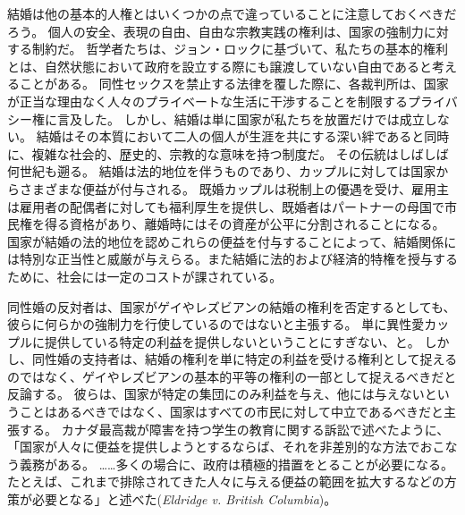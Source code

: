 \documentclass[paper=a4,book,openany]{jlreq}
\begin{document}
結婚は他の基本的人権とはいくつかの点で違っていることに注意しておくべきだろう。
個人の安全、表現の自由、自由な宗教実践の権利は、国家の強制力に対する制約だ。
哲学者たちは、ジョン・ロックに基づいて、私たちの基本的権利とは、自然状態において政府を設立する際にも譲渡していない自由であると考えることがある。
同性セックスを禁止する法律を覆した際に、各裁判所は、国家が正当な理由なく人々のプライベートな生活に干渉することを制限するプライバシー権に言及した。
しかし、結婚は単に国家が私たちを放置だけでは成立しない。
結婚はその本質において二人の個人が生涯を共にする深い絆であると同時に、複雑な社会的、歴史的、宗教的な意味を持つ制度だ。
その伝統はしばしば何世紀も遡る。
結婚は法的地位を伴うものであり、カップルに対しては国家からさまざまな便益が付与される。
既婚カップルは税制上の優遇を受け、雇用主は雇用者の配偶者に対しても福利厚生を提供し、既婚者はパートナーの母国で市民権を得る資格があり、離婚時にはその資産が公平に分割されることになる。
国家が結婚の法的地位を認めこれらの便益を付与することによって、結婚関係には特別な正当性と威厳が与えらる。また結婚に法的および経済的特権を授与するために、社会には一定のコストが課されている。

同性婚の反対者は、国家がゲイやレズビアンの結婚の権利を否定するとしても、彼らに何らかの強制力を行使しているのではないと主張する。
単に異性愛カップルに提供している特定の利益を提供しないということにすぎない、と。
しかし、同性婚の支持者は、結婚の権利を単に特定の利益を受ける権利として捉えるのではなく、ゲイやレズビアンの基本的平等の権利の一部として捉えるべきだと反論する。
彼らは、国家が特定の集団にのみ利益を与え、他には与えないということはあるべきではなく、国家はすべての市民に対して中立であるべきだと主張する。
カナダ最高裁が障害を持つ学生の教育に関する訴訟で述べたように、「国家が人々に便益を提供しようとするならば、それを非差別的な方法でおこなう義務がある。
……多くの場合に、政府は積極的措置をとることが必要になる。
たとえば、これまで排除されてきた人々に与える便益の範囲を拡大するなどの方策が必要となる」と述べた(\emph{Eldridge v. British Columbia})。
\end{document}
